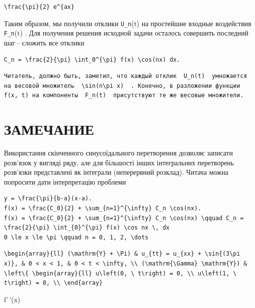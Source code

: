 \documentclass[
  ukrainian,
]{article}
\begin{document}
\begin{verbatim}
\frac{\pi}{2} e^{ax}
\end{verbatim}

Таким образом, мы получили отклики \texttt{U\_n}(t) на простейшие
входные воздействия \texttt{F\_n}(t) . Для получения решения исходной
задачи осталось совершить последний шаг---сложить все отклики

\begin{verbatim}
C_n = \frac{2}{\pi} \int_0^{\pi} f(x) \cos(nx) dx.
\end{verbatim}

\begin{verbatim}
Читатель, должно быть, заметил, что каждый отклик  U_n(t)  умножается на весовой множитель  \sin(n\pi x)  . Конечно, в разложении функции f(x, t) на компоненты  F_n(t)  присутствуют те же весовые множители.
\end{verbatim}

\section{ЗАМЕЧАНИЕ}\label{ux437ux430ux43cux435ux447ux430ux43dux438ux435}

Використання скінченного синусоїдального перетворення дозволяє записати
розв'язок у вигляді ряду, але для більшості інших інтегральних
перетворень розв'язки представлені як інтеграли (неперервний розклад).
Читача можна попросити дати інтерпретацію проблеми

\begin{verbatim}
y = \frac{\pi}{b-a}(x-a).
f(x) = \frac{C_0}{2} + \sum_{n=1}^{\infty} C_n \cos(nx).
f(x) = \frac{C_0}{2} + \sum_{n=1}^{\infty} C_n \cos(nx) \qquad C_n = \frac{2}{\pi} \int_{0}^{\pi} f(x) \cos nx \, dx
0 \le x \le \pi \qquad n = 0, 1, 2, \dots
\end{verbatim}

\begin{verbatim}
\begin{array}{ll} (\mathrm{Y} + \Pi) & u_{tt} = u_{xx} + \sin{(3\pi x)}, & 0 < x < 1, & 0 < t < \infty, \\ (\mathrm{\Gamma} \mathrm{Y}) & \left\{ \begin{array}{ll} u\left(0, \ t\right) = 0, \\ u\left(1, \ t\right) = 0, \\ \end{array}
\end{verbatim}

f'\,'(x)
\end{document}
